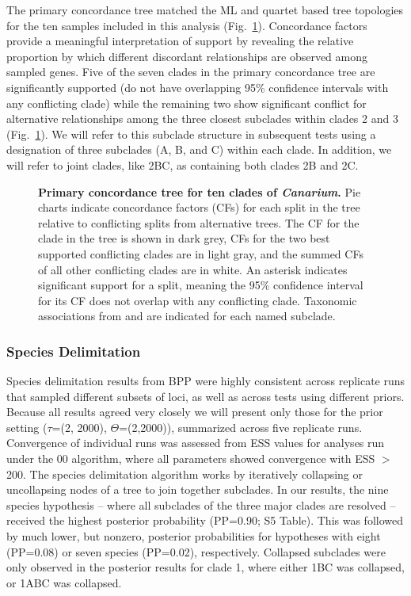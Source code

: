 \documentclass[10pt,letterpaper]{article}
\begin{document}
The primary concordance tree matched the ML and quartet based tree topologies for the ten samples included in this analysis (Fig.~\ref{fig:fig2}). Concordance factors provide a meaningful interpretation of support by revealing the relative proportion by which different discordant relationships are observed among sampled genes. Five of the seven clades in the primary concordance tree are significantly supported (do not have overlapping 95\% confidence intervals with any conflicting clade) while the remaining two show significant conflict for alternative relationships among the three closest subclades within clades 2 and 3 (Fig.~\ref{fig:fig2}). We will refer to this subclade structure in subsequent tests using a designation of three subclades (A, B, and C) within each clade. In addition, we will refer to joint clades, like 2BC, as containing both clades 2B and 2C.


\begin{figure}[!h]
  \caption{{\bf Primary concordance tree for ten clades of \emph{Canarium}.}
    Pie charts indicate concordance factors (CFs) for each split in the tree relative to conflicting
    splits from alternative trees. The CF for the clade in the tree is shown in dark grey, CFs for the two
    best supported conflicting clades are in light gray, and the summed CFs of all other conflicting
    clades are in white. An asterisk indicates significant support for a split, meaning
    the 95\% confidence interval for its CF does not overlap with any conflicting clade.
    Taxonomic associations from \cite{daly_revision_2015} and
    \cite{leenhouts_revision_1959} are indicated for each named subclade.}
  \label{fig:fig2}
\end{figure}




\subsubsection*{Species Delimitation}
Species delimitation results from BPP were highly consistent across replicate runs that sampled different subsets of loci, as well as across tests using different priors. Because all results agreed very closely we will present only those for the prior setting ($\tau$=(2, 2000), $\Theta$=(2,2000)), summarized across five replicate runs. Convergence of individual runs was assessed from ESS values for analyses run under the 00 algorithm, where all parameters showed convergence with ESS $>$ 200. The species delimitation algorithm works by iteratively collapsing or uncollapsing nodes of a tree to join together subclades. In our results, the nine species hypothesis -- where all subclades of the three major clades are resolved -- received the highest posterior probability (PP=0.90; S5 Table). %
This was followed by much lower, but nonzero, posterior probabilities for hypotheses with eight (PP=0.08) or seven species (PP=0.02), respectively. Collapsed subclades were only observed in the posterior results for clade 1, where either 1BC was collapsed, or 1ABC was collapsed. 
\end{document}
